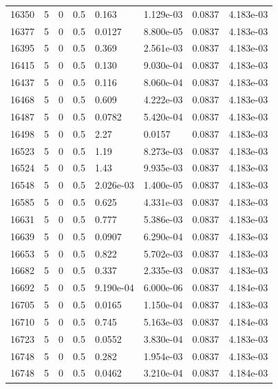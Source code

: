 \documentclass[preview]{standalone}
\begin{document}
{{{{{{{{{{{{{{{{{{\begin{tabular}{L{1.2cm}C{1.2cm} C{0.3cm}C{0.5cm} C{1.4cm}C{1.4cm} C{1.4cm}C{1.4cm}}
  16350  &     5  & 0     & 0.5 &  0.163  & 1.129e-03  & 0.0837 &  4.183e-03   \\ 
  16377  &     5  & 0     & 0.5 &  0.0127  & 8.800e-05  & 0.0837 &  4.183e-03   \\ 
  16395  &     5  & 0     & 0.5 &  0.369  & 2.561e-03  & 0.0837 &  4.183e-03   \\ 
  16415  &     5  & 0     & 0.5 &  0.130  & 9.030e-04  & 0.0837 &  4.183e-03   \\ 
  16437  &     5  & 0     & 0.5 &  0.116  & 8.060e-04  & 0.0837 &  4.183e-03   \\ 
  16468  &     5  & 0     & 0.5 &  0.609  & 4.222e-03  & 0.0837 &  4.183e-03   \\ 
  16487  &     5  & 0     & 0.5 &  0.0782  & 5.420e-04  & 0.0837 &  4.183e-03   \\ 
  16498  &     5  & 0     & 0.5 &  2.27  & 0.0157  & 0.0837 &  4.183e-03   \\ 
  16523  &     5  & 0     & 0.5 &  1.19  & 8.273e-03  & 0.0837 &  4.183e-03   \\ 
  16524  &     5  & 0     & 0.5 &  1.43  & 9.935e-03  & 0.0837 &  4.183e-03   \\ 
  16548  &     5  & 0     & 0.5 &  2.026e-03  & 1.400e-05  & 0.0837 &  4.183e-03   \\ 
  16585  &     5  & 0     & 0.5 &  0.625  & 4.331e-03  & 0.0837 &  4.183e-03   \\ 
  16631  &     5  & 0     & 0.5 &  0.777  & 5.386e-03  & 0.0837 &  4.183e-03   \\ 
  16639  &     5  & 0     & 0.5 &  0.0907  & 6.290e-04  & 0.0837 &  4.183e-03   \\ 
  16653  &     5  & 0     & 0.5 &  0.822  & 5.702e-03  & 0.0837 &  4.183e-03   \\ 
  16682  &     5  & 0     & 0.5 &  0.337  & 2.335e-03  & 0.0837 &  4.183e-03   \\ 
  16692  &     5  & 0     & 0.5 &  9.190e-04  & 6.000e-06  & 0.0837 &  4.184e-03   \\ 
  16705  &     5  & 0     & 0.5 &  0.0165  & 1.150e-04  & 0.0837 &  4.183e-03   \\ 
  16710  &     5  & 0     & 0.5 &  0.745  & 5.163e-03  & 0.0837 &  4.184e-03   \\ 
  16723  &     5  & 0     & 0.5 &  0.0552  & 3.830e-04  & 0.0837 &  4.183e-03   \\ 
  16748  &     5  & 0     & 0.5 &  0.282  & 1.954e-03  & 0.0837 &  4.183e-03   \\ 
  16748  &     5  & 0     & 0.5 &  0.0462  & 3.210e-04  & 0.0837 &  4.184e-03   \\ 

\end{tabular}}}}}}}}}}}}}}}}}}}
\end{document}
